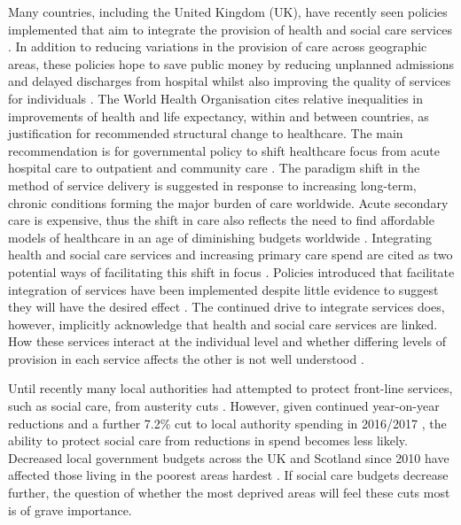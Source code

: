 \documentclass[12pt,]{report}
\begin{document}
Many countries, including the United Kingdom (UK), have recently seen
policies implemented that aim to integrate the provision of health and
social care services \citep{RN234, RN362, RN262}. In addition to
reducing variations in the provision of care across geographic areas,
these policies hope to save public money by reducing unplanned
admissions and delayed discharges from hospital whilst also improving
the quality of services for individuals \citep{RN232, RN266, RN406}. The
World Health Organisation \citeyearpar{RN320} cites relative
inequalities in improvements of health and life expectancy, within and
between countries, as justification for recommended structural change to
healthcare. The main recommendation is for governmental policy to shift
healthcare focus from acute hospital care to outpatient and community
care \citep{RN320}. The paradigm shift in the method of service delivery
is suggested in response to increasing long-term, chronic conditions
forming the major burden of care worldwide. Acute secondary care is
expensive, thus the shift in care also reflects the need to find
affordable models of healthcare in an age of diminishing budgets
worldwide \citep{RN320}. Integrating health and social care services and
increasing primary care spend are cited as two potential ways of
facilitating this shift in focus \citep{RN320}. Policies introduced that
facilitate integration of services have been implemented despite little
evidence to suggest they will have the desired effect
\citep{RN367, RN369, RN234, RN233, RN321, RN362, RN366, RN260}. The
continued drive to integrate services does, however, implicitly
acknowledge that health and social care services are linked. How these
services interact at the individual level and whether differing levels
of provision in each service affects the other is not well understood
\citep{RN361, RN205, RN406}.

Until recently many local authorities had attempted to protect
front-line services, such as social care, from austerity cuts
\citep{RN117}. However, given continued year-on-year reductions and a
further 7.2\% cut to local authority spending in 2016/2017
\citep{RN251}, the ability to protect social care from reductions in
spend becomes less likely. Decreased local government budgets across the
UK and Scotland since 2010 have affected those living in the poorest
areas hardest \citep{RN117, RN235}. If social care budgets decrease
further, the question of whether the most deprived areas will feel these
cuts most is of grave importance.
\end{document}
